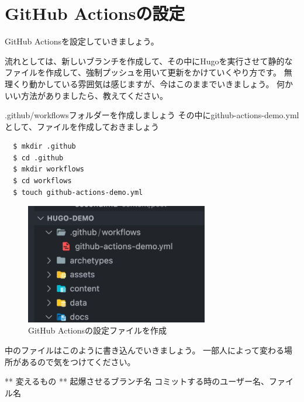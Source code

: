 \chapter{GitHub Actionsの設定}

GitHub Actionsを設定していきましょう。

流れとしては、新しいブランチを作成して、その中にHugoを実行させて静的なファイルを作成して、強制プッシュを用いて更新をかけていくやり方です。
無理くり動かしている雰囲気は感じますが、今はこのままでいきましょう。
何かいい方法がありましたら、教えてください。

.github/workflowsフォルダーを作成しましょう
その中にgithub-actions-demo.ymlとして、ファイルを作成しておきましょう

\begin{shaded}
  \begin{verbatim}
  $ mkdir .github
  $ cd .github
  $ mkdir workflows
  $ cd workflows
  $ touch github-actions-demo.yml
  \end{verbatim}
\end{shaded}

\begin{figure}[H]
  \centering
  \includegraphics[width=8cm]{./image/02-chap8/make-github-workflow.png}
  \caption{GitHub Actionsの設定ファイルを作成 }
  \label{chap8-make-github-workflow-image}
\end{figure}

中のファイルはこのように書き込んでいきましょう。
一部人によって変わる場所があるので気をつけてください。

** 変えるもの **
起爆させるブランチ名 コミットする時のユーザー名、ファイル名

